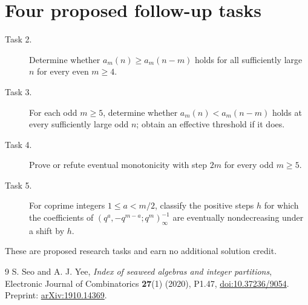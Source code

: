 \documentclass[11pt]{article}
\begin{document}
\section*{Four proposed follow-up tasks}
\begin{description}
\item[Task 2.] Determine whether $a_m(n)\ge a_m(n-m)$ holds for all
sufficiently large $n$ for every even $m\ge4$.
\item[Task 3.] For each odd $m\ge5$, determine whether
$a_m(n)<a_m(n-m)$ holds at every sufficiently large odd $n$;
obtain an effective threshold if it does.
\item[Task 4.] Prove or refute eventual monotonicity with step $2m$
for every odd $m\ge5$.
\item[Task 5.] For coprime integers $1\le a<m/2$, classify the positive
steps $h$ for which the coefficients of
$(q^a,-q^{m-a};q^m)_\infty^{-1}$ are eventually nondecreasing
under a shift by $h$.
\end{description}
These are proposed research tasks and earn no additional solution credit.

\begin{thebibliography}{9}
 S. Seo and A. J. Yee,
\emph{Index of seaweed algebras and integer partitions},
Electronic Journal of Combinatorics \textbf{27}(1) (2020), P1.47,
\href{https://doi.org/10.37236/9054}{doi:10.37236/9054}.
Preprint: \href{https://arxiv.org/abs/1910.14369}{arXiv:1910.14369}.
\end{thebibliography}
\end{document}
